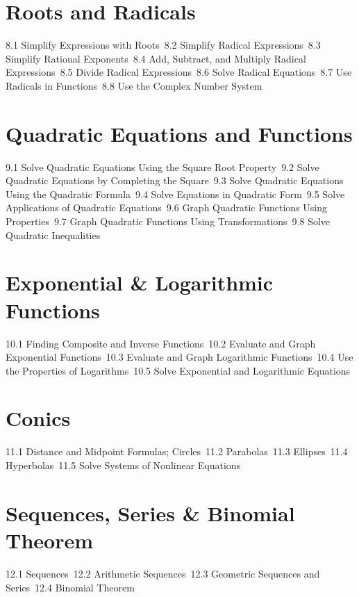 \section{Roots and Radicals}
8.1 Simplify Expressions with Roots\
8.2 Simplify Radical Expressions\
8.3 Simplify Rational Exponents\
8.4 Add, Subtract, and Multiply Radical Expressions\
8.5 Divide Radical Expressions\
8.6 Solve Radical Equations\
8.7 Use Radicals in Functions\
8.8 Use the Complex Number System\
\section{Quadratic Equations and Functions}
9.1 Solve Quadratic Equations Using the Square Root Property\
9.2 Solve Quadratic Equations by Completing the Square\
9.3 Solve Quadratic Equations Using the Quadratic Formula\
9.4 Solve Equations in Quadratic Form\
9.5 Solve Applications of Quadratic Equations\
9.6 Graph Quadratic Functions Using Properties\
9.7 Graph Quadratic Functions Using Transformations\
9.8 Solve Quadratic Inequalities\
\section{Exponential \& Logarithmic Functions}
10.1 Finding Composite and Inverse Functions\
10.2 Evaluate and Graph Exponential Functions\
10.3 Evaluate and Graph Logarithmic Functions\
10.4 Use the Properties of Logarithms\
10.5 Solve Exponential and Logarithmic Equations\
\section{Conics}
11.1 Distance and Midpoint Formulas; Circles\
11.2 Parabolas\
11.3 Ellipses\
11.4 Hyperbolas\
11.5 Solve Systems of Nonlinear Equations\
\section{Sequences, Series \& Binomial Theorem}
12.1 Sequences\
12.2 Arithmetic Sequences\
12.3 Geometric Sequences and Series\
12.4 Binomial Theorem\
